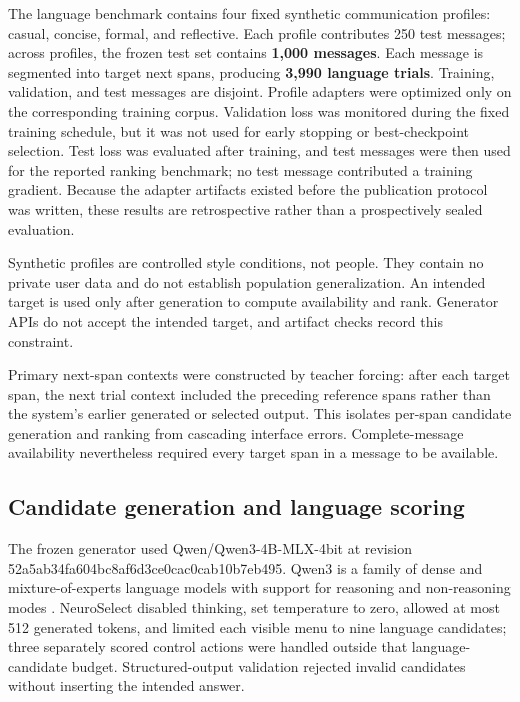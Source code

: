 \documentclass[11pt]{article}
\begin{document}
The language benchmark contains four fixed synthetic communication profiles: casual, concise, formal, and reflective. Each profile contributes 250 test messages; across profiles, the frozen test set contains \textbf{1,000 messages}. Each message is segmented into target next spans, producing \textbf{3,990 language trials}. Training, validation, and test messages are disjoint. Profile adapters were optimized only on the corresponding training corpus. Validation loss was monitored during the fixed training schedule, but it was not used for early stopping or best-checkpoint selection. Test loss was evaluated after training, and test messages were then used for the reported ranking benchmark; no test message contributed a training gradient. Because the adapter artifacts existed before the publication protocol was written, these results are retrospective rather than a prospectively sealed evaluation.


Synthetic profiles are controlled style conditions, not people. They contain no private user data and do not establish population generalization. An intended target is used only after generation to compute availability and rank. Generator APIs do not accept the intended target, and artifact checks record this constraint.


Primary next-span contexts were constructed by teacher forcing: after each target span, the next trial context included the preceding reference spans rather than the system's earlier generated or selected output. This isolates per-span candidate generation and ranking from cascading interface errors. Complete-message availability nevertheless required every target span in a message to be available.


\subsection{Candidate generation and language scoring}

The frozen generator used Qwen/Qwen3-4B-MLX-4bit at revision 52a5ab34fa604bc8af6d3ce0cac0cab10b7eb495. Qwen3 is a family of dense and mixture-of-experts language models with support for reasoning and non-reasoning modes \cite{qwen32025}. NeuroSelect disabled thinking, set temperature to zero, allowed at most 512 generated tokens, and limited each visible menu to nine language candidates; three separately scored control actions were handled outside that language-candidate budget. Structured-output validation rejected invalid candidates without inserting the intended answer.
\end{document}
